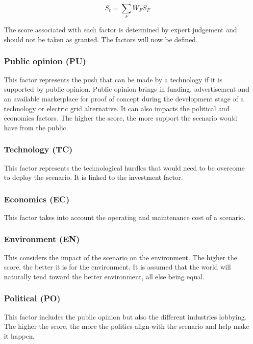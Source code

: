 \documentclass[IJPHM, 2017, 29]{PHMSociety}
\begin{document}
\begin{equation}
\label{eq1}
S_t = \sum_F {W_F S_F}
\end{equation}

The score associated with each factor is determined by expert judgement and should not be taken as granted. The factors will now be defined.

\subsubsection{Public opinion (PU)}

This factor represents the push that can be made by a technology if it is supported by public opinion. Public opinion brings in funding, advertisement and an available marketplace for proof of concept during the development stage of a technology or electric grid alternative. It can also impacts the political and economics factors. The higher the score, the more support the scenario would have from the public.

\subsubsection{Technology (TC)}

This factor represents the technological hurdles that would need to be overcome to deploy the scenario. It is linked to the investment factor.

\subsubsection{Economics (EC)}

This factor takes into account the operating and maintenance cost of a scenario.

\subsubsection{Environment (EN)}

This considers the impact of the scenario on the environment. The higher the score, the better it is for the environment. It is assumed that the world will naturally tend toward the better environment, all else being equal.

\subsubsection{Political (PO)}

This factor includes the public opinion but also the different industries lobbying. The higher the score, the more the politics align with the scenario and help make it happen.
\end{document}
